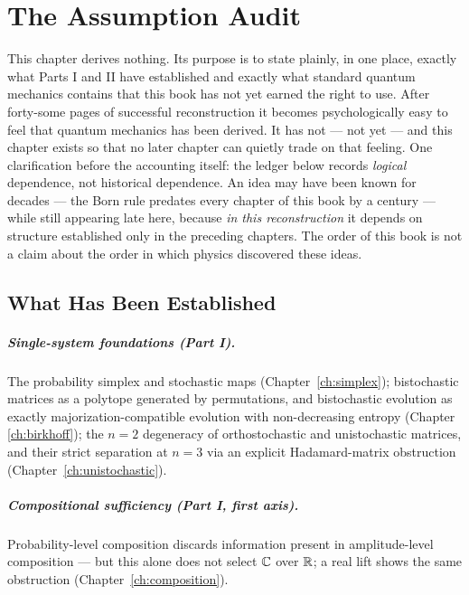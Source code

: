 \chapter{The Assumption Audit}
\label{ch:assumption-audit}

This chapter derives nothing. Its purpose is to state plainly, in one place,
exactly what Parts I and II have established and exactly what standard
quantum mechanics contains that this book has not yet earned the right to
use. After forty-some pages of successful reconstruction it becomes
psychologically easy to feel that quantum mechanics has been derived. It has
not — not yet — and this chapter exists so that no later chapter can quietly
trade on that feeling. One clarification before the accounting itself: the
ledger below records \emph{logical} dependence, not historical dependence.
An idea may have been known for decades — the Born rule predates every
chapter of this book by a century — while still appearing late here, because
\emph{in this reconstruction} it depends on structure established only in
the preceding chapters. The order of this book is not a claim about the
order in which physics discovered these ideas.

\section{What Has Been Established}

\paragraph{Single-system foundations (Part I).} The probability simplex and
stochastic maps (Chapter~\ref{ch:simplex}); bistochastic matrices as a
polytope generated by permutations, and bistochastic evolution as exactly
majorization-compatible evolution with non-decreasing entropy (Chapter
\ref{ch:birkhoff}); the $n=2$ degeneracy of orthostochastic and unistochastic
matrices, and their strict separation at $n=3$ via an explicit
Hadamard-matrix obstruction (Chapter~\ref{ch:unistochastic}).

\paragraph{Compositional sufficiency (Part I, first axis).} Probability-level
composition discards information present in amplitude-level composition —
but this alone does not select $\mathbb{C}$ over $\mathbb{R}$; a real lift shows the same
obstruction (Chapter~\ref{ch:composition}).

